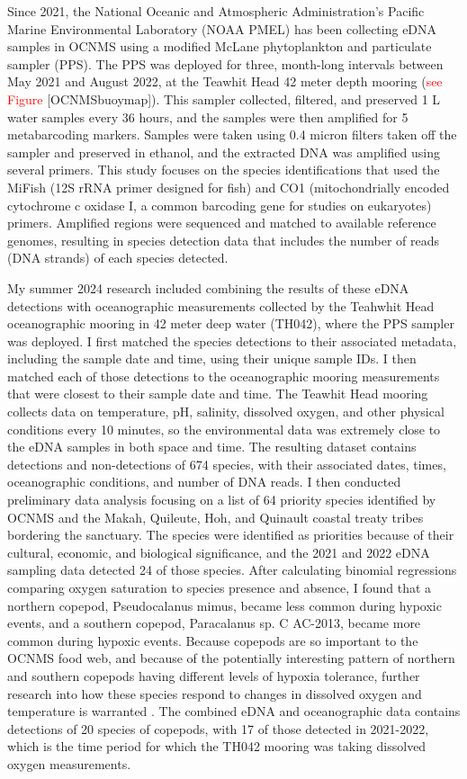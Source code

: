 \documentclass[12pt,twoside]{reedthesis}
\begin{document}
Since 2021, the National Oceanic and Atmospheric Administration's Pacific Marine Environmental Laboratory (NOAA PMEL) has been collecting eDNA samples in OCNMS using a modified McLane phytoplankton and particulate sampler (PPS).  The PPS was deployed for three, month-long intervals between May 2021 and August 2022, at the Teawhit Head 42 meter depth mooring (\textcolor{red}{see Figure} [OCNMSbuoymap]). This sampler collected, filtered, and preserved 1 L water samples every 36 hours, and the samples were then amplified for 5 metabarcoding markers. Samples were taken using 0.4 micron filters taken off the sampler and preserved in ethanol, and the extracted DNA was amplified using several primers. This study focuses on the species identifications that used the MiFish (12S rRNA primer designed for fish) and CO1 (mitochondrially encoded cytochrome c oxidase I, a common barcoding gene for studies on eukaryotes) primers. Amplified regions were sequenced and matched to available reference genomes, resulting in species detection data that includes the number of reads (DNA strands) of each species detected. 

My summer 2024 research included combining the results of these eDNA detections with oceanographic measurements collected by the Teahwhit Head oceanographic mooring in 42 meter deep water (TH042), where the PPS sampler was deployed. I first matched the species detections to their associated metadata, including the sample date and time, using their unique sample IDs. I then matched each of those detections to the oceanographic mooring measurements that were closest to their sample date and time. The Teawhit Head mooring collects data on temperature, pH, salinity, dissolved oxygen, and other physical conditions every 10 minutes, so the environmental data was extremely close to the eDNA samples in both space and time. The resulting dataset contains detections and non-detections of 674 species, with their associated dates, times, oceanographic conditions, and number of DNA reads. I then conducted preliminary data analysis focusing on a list of 64 priority species identified by OCNMS and the Makah, Quileute, Hoh, and Quinault coastal treaty tribes bordering the sanctuary. The species were identified as priorities because of their cultural, economic, and biological significance, and the 2021 and 2022 eDNA sampling data detected 24 of those species. After calculating binomial regressions comparing oxygen saturation to species presence and absence, I found that a northern copepod, Pseudocalanus mimus, became less common during hypoxic events, and a southern copepod, Paracalanus sp. C AC-2013, became more common during hypoxic events. Because copepods are so important to the OCNMS food web, and because of the potentially interesting pattern of northern and southern copepods having different levels of hypoxia tolerance, further research into how these species respond to changes in dissolved oxygen and temperature is warranted \autocite{Fisheries2024}. The combined eDNA and oceanographic data contains detections of 20 species of copepods, with 17 of those detected in 2021-2022, which is the time period for which the TH042 mooring was taking dissolved oxygen measurements.
\end{document}
